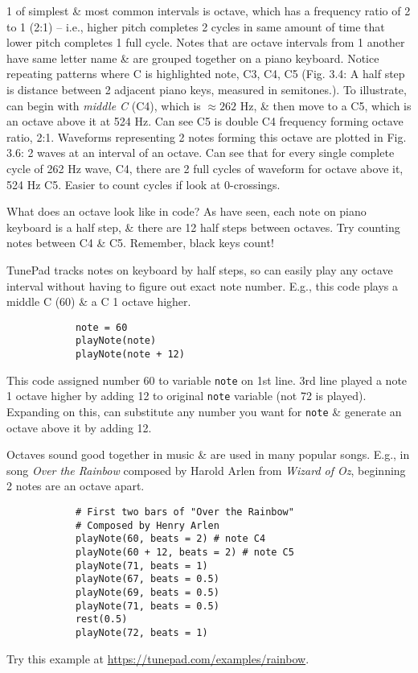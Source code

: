 \documentclass{article}
\begin{document}
\begin{itemize}
\begin{itemize}
		1 of simplest \& most common intervals is octave, which has a frequency ratio of 2 to 1 (2:1) -- i.e., higher pitch completes 2 cycles in same amount of time that lower pitch completes 1 full cycle. Notes that are octave intervals from 1 another have same letter name \& are grouped together on a piano keyboard. Notice repeating patterns where C is highlighted note, C3, C4, C5 ({\sf Fig. 3.4: A half step is distance between 2 adjacent piano keys, measured in semitones.}). To illustrate, can begin with {\it middle C} (C4), which is $\approx262$ Hz, \& then move to a C5, which is an octave above it at 524 Hz. Can see C5 is double C4 frequency forming octave ratio, 2:1. Waveforms representing 2 notes forming this octave are plotted in {\sf Fig. 3.6: 2 waves at an interval of an octave.} Can see that for every single complete cycle of 262 Hz wave, C4, there are 2 full cycles of waveform for octave above it, 524 Hz C5. Easier to count cycles if look at 0-crossings.
		
		What does an octave look like in code? As have seen, each note on piano keyboard is a half step, \& there are 12 half steps between octaves. Try counting notes between C4 \& C5. Remember, black keys count!
		
		TunePad tracks notes on keyboard by half steps, so can easily play any octave interval without having to figure out exact note number. E.g., this code plays a middle C (60) \& a C 1 octave higher.
		\begin{verbatim}
			note = 60
			playNote(note)
			playNote(note + 12)
		\end{verbatim}
		This code assigned number 60 to variable {\tt note} on 1st line. 3rd line played a note 1 octave higher by adding 12 to original {\tt note} variable (not 72 is played). Expanding on this, can substitute any number you want for {\tt note} \& generate an octave above it by adding 12.
		
		Octaves sound good together in music \& are used in many popular songs. E.g., in song {\it Over the Rainbow} composed by {\sc Harold Arlen} from {\it Wizard of Oz}, beginning 2 notes are an octave apart.
		\begin{verbatim}
			# First two bars of "Over the Rainbow"
			# Composed by Henry Arlen
			playNote(60, beats = 2) # note C4
			playNote(60 + 12, beats = 2) # note C5
			playNote(71, beats = 1)
			playNote(67, beats = 0.5)
			playNote(69, beats = 0.5)
			playNote(71, beats = 0.5)
			rest(0.5)
			playNote(72, beats = 1)
		\end{verbatim}
		Try this example at \url{https://tunepad.com/examples/rainbow}.
		

\end{itemize}
\end{itemize}
\end{document}
